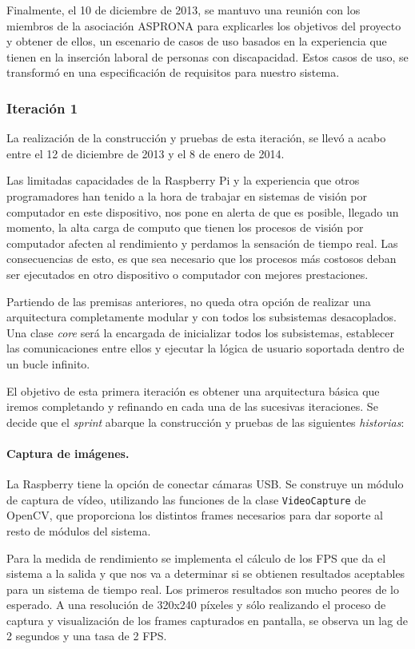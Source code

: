 Finalmente, el 10 de diciembre de 2013, se mantuvo una reunión con los miembros de la asociación ASPRONA para explicarles los objetivos del proyecto y obtener de ellos, un escenario de casos de uso basados en la experiencia que tienen en la inserción laboral de personas con discapacidad. Estos casos de uso, se transformó en una especificación de requisitos para nuestro sistema.

\subsubsection{Iteración 1}
La realización de la construcción y pruebas de esta iteración, se llevó a acabo entre el 12 de diciembre de 2013 y el 8 de enero de 2014.

Las limitadas capacidades de la Raspberry Pi y la experiencia que otros programadores han tenido a la hora de trabajar en sistemas de visión por computador en este dispositivo, nos pone en alerta de que es posible, llegado un momento, la alta carga de computo que tienen los procesos de visión por computador afecten al rendimiento y perdamos la sensación de tiempo real. Las consecuencias de esto, es que sea necesario que los procesos más costosos deban ser ejecutados en otro dispositivo o computador con mejores prestaciones.  

Partiendo de las premisas anteriores, no queda otra opción de realizar una arquitectura completamente modular y con todos los subsistemas desacoplados. Una clase \emph{core} será la encargada de inicializar todos los subsistemas, establecer las comunicaciones entre ellos y ejecutar la lógica de usuario soportada dentro de un bucle infinito.

El objetivo de esta primera iteración es obtener una arquitectura básica que iremos completando y refinando en cada una de las sucesivas iteraciones. Se decide que el \textit{sprint} abarque la construcción y pruebas de las siguientes \textit{historias}:

\paragraph{Captura de imágenes.}
La Raspberry tiene la opción de conectar cámaras USB. Se construye un módulo de captura de vídeo, utilizando las funciones de la clase \texttt{VideoCapture} de OpenCV, que proporciona los distintos frames necesarios para dar soporte al resto de módulos del sistema. 

Para la medida de rendimiento se implementa el cálculo de los FPS que da el sistema a la salida y que nos va a determinar si se obtienen resultados aceptables para un sistema de tiempo real. Los primeros resultados son mucho peores de lo esperado. A una resolución de 320x240 píxeles y sólo realizando el proceso de captura y visualización de los frames capturados en pantalla, se observa un lag de 2 segundos y una tasa de 2 FPS. 

